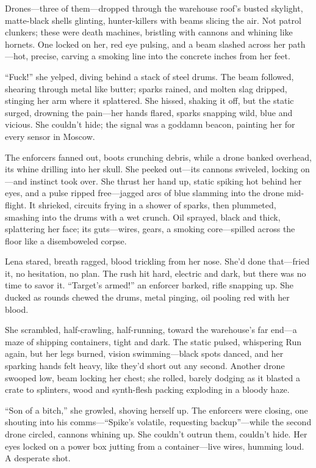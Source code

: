 \documentclass[12pt]{book}
\begin{document}
Drones—three of them—dropped through the warehouse roof’s busted skylight, matte-black shells glinting, hunter-killers with beams slicing the air. Not patrol clunkers; these were death machines, bristling with cannons and whining like hornets. One locked on her, red eye pulsing, and a beam slashed across her path—hot, precise, carving a smoking line into the concrete inches from her feet.

“Fuck!” she yelped, diving behind a stack of steel drums. The beam followed, shearing through metal like butter; sparks rained, and molten slag dripped, stinging her arm where it splattered. She hissed, shaking it off, but the static surged, drowning the pain—her hands flared, sparks snapping wild, blue and vicious. She couldn’t hide; the signal was a goddamn beacon, painting her for every sensor in Moscow.

The enforcers fanned out, boots crunching debris, while a drone banked overhead, its whine drilling into her skull. She peeked out—its cannons swiveled, locking on—and instinct took over. She thrust her hand up, static spiking hot behind her eyes, and a pulse ripped free—jagged arcs of blue slamming into the drone mid-flight. It shrieked, circuits frying in a shower of sparks, then plummeted, smashing into the drums with a wet crunch. Oil sprayed, black and thick, splattering her face; its guts—wires, gears, a smoking core—spilled across the floor like a disemboweled corpse.

Lena stared, breath ragged, blood trickling from her nose. She’d done that—fried it, no hesitation, no plan. The rush hit hard, electric and dark, but there was no time to savor it. “Target’s armed!” an enforcer barked, rifle snapping up. She ducked as rounds chewed the drums, metal pinging, oil pooling red with her blood.

She scrambled, half-crawling, half-running, toward the warehouse’s far end—a maze of shipping containers, tight and dark. The static pulsed, whispering Run again, but her legs burned, vision swimming—black spots danced, and her sparking hands felt heavy, like they’d short out any second. Another drone swooped low, beam locking her chest; she rolled, barely dodging as it blasted a crate to splinters, wood and synth-flesh packing exploding in a bloody haze.

“Son of a bitch,” she growled, shoving herself up. The enforcers were closing, one shouting into his comms—“Spike’s volatile, requesting backup”—while the second drone circled, cannons whining up. She couldn’t outrun them, couldn’t hide. Her eyes locked on a power box jutting from a container—live wires, humming loud. A desperate shot.
\end{document}
